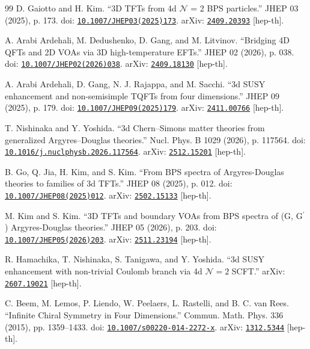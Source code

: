 \documentclass[11pt,a4paper]{article}
\numberwithin{equation}{section}
\begin{document}
\begin{thebibliography}{99}
D. Gaiotto and H. Kim. ``3D TFTs from 4d $ \mathcal{N} $ = 2 BPS particles.'' JHEP 03 (2025), p. 173. doi: \href{https://doi.org/10.1007/JHEP03(2025)173}{\nolinkurl{10.1007/JHEP03(2025)173}}. arXiv: \href{https://arxiv.org/abs/2409.20393}{\nolinkurl{2409.20393}} [hep-th].

A. Arabi Ardehali, M. Dedushenko, D. Gang, and M. Litvinov. ``Bridging 4D QFTs and 2D VOAs via 3D high-temperature EFTs.'' JHEP 02 (2026), p. 038. doi: \href{https://doi.org/10.1007/JHEP02(2026)038}{\nolinkurl{10.1007/JHEP02(2026)038}}. arXiv: \href{https://arxiv.org/abs/2409.18130}{\nolinkurl{2409.18130}} [hep-th].

A. Arabi Ardehali, D. Gang, N. J. Rajappa, and M. Sacchi. ``3d SUSY enhancement and non-semisimple TQFTs from four dimensions.'' JHEP 09 (2025), p. 179. doi: \href{https://doi.org/10.1007/JHEP09(2025)179}{\nolinkurl{10.1007/JHEP09(2025)179}}. arXiv: \href{https://arxiv.org/abs/2411.00766}{\nolinkurl{2411.00766}} [hep-th].

T. Nishinaka and Y. Yoshida. ``3d Chern--Simons matter theories from generalized Argyres--Douglas theories.'' Nucl. Phys. B 1029 (2026), p. 117564. doi: \href{https://doi.org/10.1016/j.nuclphysb.2026.117564}{\nolinkurl{10.1016/j.nuclphysb.2026.117564}}. arXiv: \href{https://arxiv.org/abs/2512.15201}{\nolinkurl{2512.15201}} [hep-th].

B. Go, Q. Jia, H. Kim, and S. Kim. ``From BPS spectra of Argyres-Douglas theories to families of 3d TFTs.'' JHEP 08 (2025), p. 012. doi: \href{https://doi.org/10.1007/JHEP08(2025)012}{\nolinkurl{10.1007/JHEP08(2025)012}}. arXiv: \href{https://arxiv.org/abs/2502.15133}{\nolinkurl{2502.15133}} [hep-th].

M. Kim and S. Kim. ``3D TFTs and boundary VOAs from BPS spectra of (G, G$^{\prime}$) Argyres-Douglas theories.'' JHEP 05 (2026), p. 203. doi: \href{https://doi.org/10.1007/JHEP05(2026)203}{\nolinkurl{10.1007/JHEP05(2026)203}}. arXiv: \href{https://arxiv.org/abs/2511.23194}{\nolinkurl{2511.23194}} [hep-th].

R. Hamachika, T. Nishinaka, S. Tanigawa, and Y. Yoshida. ``3d SUSY enhancement with non-trivial Coulomb branch via 4d $\mathcal{N}=2$ SCFT.'' arXiv: \href{https://arxiv.org/abs/2607.19021}{\nolinkurl{2607.19021}} [hep-th].

C. Beem, M. Lemos, P. Liendo, W. Peelaers, L. Rastelli, and B. C. van Rees. ``Infinite Chiral Symmetry in Four Dimensions.'' Commun. Math. Phys. 336 (2015), pp. 1359--1433. doi: \href{https://doi.org/10.1007/s00220-014-2272-x}{\nolinkurl{10.1007/s00220-014-2272-x}}. arXiv: \href{https://arxiv.org/abs/1312.5344}{\nolinkurl{1312.5344}} [hep-th].


\end{thebibliography}
\end{document}
